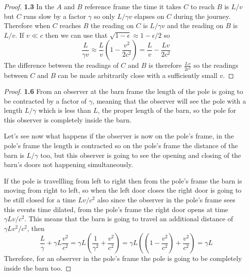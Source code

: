 \documentclass[11pt]{article}
\theoremstyle{definition}
\begin{document}
	\begin{proof}{\textbf{1.3}}
        In the $A$ and $B$ reference frame the time it takes $C$ to reach $B$
        is $L/v$ but $C$ runs slow by a factor $\gamma$ so only $L/\gamma v$
        elapses on $C$ during the journey. Therefore when $C$ reaches $B$ the
        reading on $C$ is $L/\gamma v$ and the reading on $B$ is $L/v$. If
        $v \ll c$ then we can use that $\sqrt{1 - \epsilon} \approx 1 - \epsilon/2$
        so
        $$\frac{L}{\gamma v} \approx \frac{L}{v}(1 - \frac{v^2}{2c^2}) =
        \frac{L}{v} - \frac{Lv}{2c^2}$$
        The difference between the readings of $C$ and $B$ is therefore
        $\frac{Lv}{2c^2}$ so the readings between $C$ and $B$ can be made
        arbitrarily close with a sufficiently small $v$.  
    \end{proof}
	\begin{proof}{\textbf{1.6}}
        From an observer at the barn frame the length of the pole is going to
        be contracted by a factor of $\gamma$, meaning that the observer will
        see the pole with a length $L/\gamma$ which is less than $L$, the
        proper length of the barn, so the pole for this observer is completely
        inside the barn.

        Let's see now what happens if the observer is now on the pole's frame,
        in the pole's frame the length is contracted so on the pole's frame the
        distance of the barn is $L/\gamma$ too, but this observer is going to see
        the opening and closing of the barn's doors not happening simultaneously.
        
        If the pole is travellling from left to right then from the pole's
        frame the barn is moving from right to left, so when the left door
        closes the right door is going to be still closed for a time $Lv/c^2$ also
        since the observer in the pole's frame sees this events time dilated,
        from the pole's frame the right door opens at time $\gamma Lv/c^2$.
        This means that the barn is going to travel an additional distance of
        $\gamma Lv^2/c^2$, then
        $$\frac{L}{\gamma} + \gamma L\frac{v^2}{c^2} = 
        \gamma L(\frac{1}{\gamma^2} + \frac{v^2}{c^2}) =
        \gamma L\left((1 - \frac{v^2}{c^2}) + \frac{v^2}{c^2}\right) = \gamma L$$
        Therefore, for an observer in the pole's frame the pole is going to be
        completely inside the barn too.
    \end{proof}
\cleardoublepage
\end{document}
